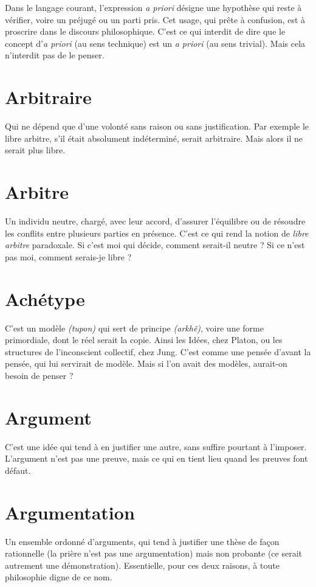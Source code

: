 Dans le langage courant, l'expression {\it a priori} désigne une hypothèse qui
reste à vérifier, voire un préjugé ou un parti pris. Cet usage, qui prête à confusion,
est à proscrire dans le discours philosophique. C’est ce qui interdit de dire
que le concept d’{\it a priori} (au sens technique) est un {\it a priori} (au sens trivial).
Mais cela n’interdit pas de le penser.

\section{Arbitraire}
Qui ne dépend que d’une volonté sans raison ou sans justification.
Par exemple le libre arbitre, s’il était absolument
indéterminé, serait arbitraire. Mais alors il ne serait plus libre.

\section{Arbitre}
Un individu neutre, chargé, avec leur accord, d’assurer l'équilibre
ou de résoudre les conflits entre plusieurs parties en présence.
C’est ce qui rend la notion de {\it libre arbitre} paradoxale. Si c’est moi qui décide,
comment serait-il neutre ? Si ce n’est pas moi, comment serais-je libre ?

\section{Achétype}
C’est un modèle {\it (tupon)} qui sert de principe {\it (arkhê)}, voire
une forme primordiale, dont le réel serait la copie. Ainsi les
Idées, chez Platon, ou les structures de l'inconscient collectif, chez Jung. C’est
comme une pensée d’avant la pensée, qui lui servirait de modèle. Mais si l’on
avait des modèles, aurait-on besoin de penser ?

\section{Argument}
C’est une idée qui tend à en justifier une autre, sans suffire
pourtant à l’imposer. L’argument n’est pas une preuve, mais
ce qui en tient lieu quand les preuves font défaut.

\section{Argumentation}
Un ensemble ordonné d’arguments, qui tend à justifier
une thèse de façon rationnelle (la prière n’est pas
une argumentation) mais non probante (ce serait autrement une démonstration).
Essentielle, pour ces deux raisons, à toute philosophie digne de ce nom.

